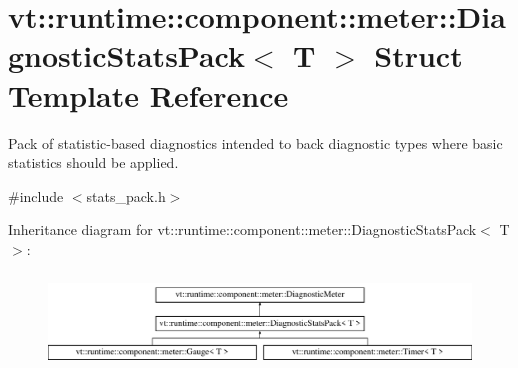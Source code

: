 \hypertarget{structvt_1_1runtime_1_1component_1_1meter_1_1_diagnostic_stats_pack}{}\section{vt\+:\+:runtime\+:\+:component\+:\+:meter\+:\+:Diagnostic\+Stats\+Pack$<$ T $>$ Struct Template Reference}
\label{structvt_1_1runtime_1_1component_1_1meter_1_1_diagnostic_stats_pack}


Pack of statistic-\/based diagnostics intended to back diagnostic types where basic statistics should be applied.  




{\ttfamily \#include $<$stats\+\_\+pack.\+h$>$}

Inheritance diagram for vt\+:\+:runtime\+:\+:component\+:\+:meter\+:\+:Diagnostic\+Stats\+Pack$<$ T $>$\+:\begin{figure}[H]
\begin{center}
\leavevmode
\includegraphics[height=2.530120cm]{structvt_1_1runtime_1_1component_1_1meter_1_1_diagnostic_stats_pack}
\end{center}
\end{figure}
